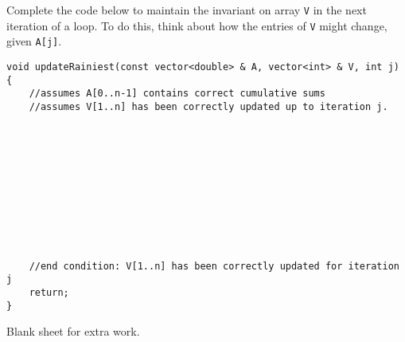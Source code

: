 \documentclass[11pt]{article}
\begin{document}
\begin{enumerate}
\begin{enumerate}
Complete the code below to maintain the invariant on array {\tt V} in the next iteration of a loop. To do this, think about how the entries of {\tt V} might change, given {\tt A[j]}. 

\begin{lstlisting}
void updateRainiest(const vector<double> & A, vector<int> & V, int j) {
    //assumes A[0..n-1] contains correct cumulative sums
    //assumes V[1..n] has been correctly updated up to iteration j.
    
 
 
 
 
    
    
    
    
    
    
    //end condition: V[1..n] has been correctly updated for iteration j
    return;
}
\end{lstlisting}


\end{enumerate}

\end{enumerate}

\newpage
Blank sheet for extra work.
\end{document}

